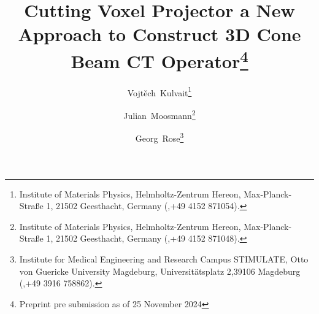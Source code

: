 

\usepackage{lipsum}
\usepackage{amsfonts}
\usepackage{graphicx}
\usepackage{epstopdf}
\usepackage{algorithmic}
\ifpdf
\else
\fi

\usepackage{cite}
\usepackage{amsmath,amssymb,amsfonts}
\usepackage{algorithmic}
\usepackage{graphicx}
\usepackage{textcomp}
\usepackage{siunitx}
\usepackage{url}
\usepackage{booktabs}
\usepackage{colortbl}
\usepackage{xcolor}
\newcommand{\rowcol}{\rowcolor{tablerowcolor}} %
\let\vec\mathbf %
\usepackage{color} %
\newcommand{\RED}[1]{\textcolor{red}{#1}}
\newcommand{\BLUE}[1]{\textcolor{blue}{#1}}
\newcommand{\GREEN}[1]{\textcolor{green}{#1}}
\newcommand{\figref}[1]{Figure~\ref{#1}}
\newcommand{\INTEGRAL}[3]{\int\limits#1 \! #2 \, \mathrm{d} #3}
\DeclareMathOperator{\atantwo}{atan2}





\newcommand{\creflastconjunction}{, and~}



\title{Cutting Voxel Projector a New Approach to Construct 3D Cone Beam CT Operator\thanks{
Preprint pre submission as of 25 November 2024
}}

\author{Vojt\v{e}ch~Kulvait\thanks{Institute of Materials Physics, Helmholtz-Zentrum Hereon, Max-Planck-Straße 1, 21502 Geesthacht, Germany (,+49 4152 871054).}
\and Julian~Moosmann\thanks{Institute of Materials Physics, Helmholtz-Zentrum Hereon, Max-Planck-Straße 1, 21502 Geesthacht, Germany (,+49 4152 871048).}
\and Georg~Rose\thanks{Institute for Medical Engineering and Research Campus STIMULATE, Otto von Guericke University Magdeburg, Universitätsplatz 2,39106 Magdeburg (,+49 3916 758862).}}

